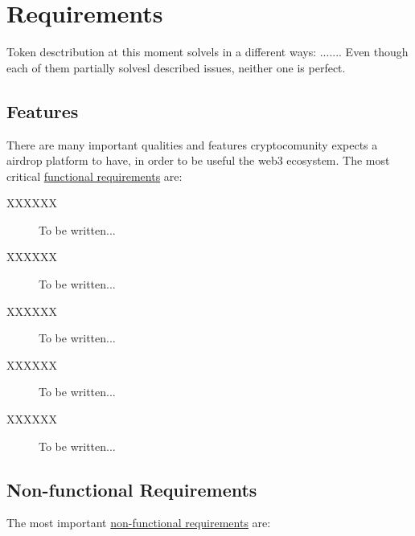 \documentclass[12pt,oneside]{article}
\begin{document}
\section{Requirements}
\label{sec:requirements}

Token desctribution at this moment solvels in a different ways: .......
Even though each of them partially solvesl described issues, neither one is perfect.

\subsection{Features}
\label{sec:features}

There are many important qualities and features cryptocomunity expects a airdrop platform to have,
in order to be useful the web3 ecosystem. The most critical \href{https://en.wikipedia.org/wiki/Functional_requirement}{functional requirements}
are:

\begin{description}
  \item[XXXXXX]
  To be written...

  \item[XXXXXX]
  To be written...

  \item[XXXXXX]
  To be written...

  \item[XXXXXX]
  To be written...

  \item[XXXXXX]
  To be written...
\end{description}

\subsection{Non-functional Requirements}
\label{sec:nfr}

The most important \href{https://en.wikipedia.org/wiki/Non-functional_requirement}{non-functional requirements} are:
\end{document}
